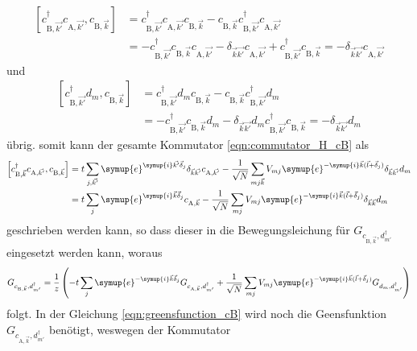 \begin{align*}
    \left [ c^\dagger_{\text{B},\vec{k'}} c_{\text{A},\vec{k'}}, c_{\text{B},\vec{k}} \right ]
        &= c^\dagger_{\text{B},\vec{k'}} c_{\text{A},\vec{k'}} c_{\text{B},\vec{k}} - c_{\text{B},\vec{k}} c^\dagger_{\text{B},\vec{k'}} c_{\text{A},\vec{k'}} \\
        &= - c^\dagger_{\text{B},\vec{k'}} c_{\text{B},\vec{k}} c_{\text{A},\vec{k'}} - \delta_{\vec{k}\vec{k'}} c_{\text{A},\vec{k'}}
        + c^\dagger_{\text{B},\vec{k'}} c_{\text{B},\vec{k}} =  - \delta_{\vec{k}\vec{k'}} c_{\text{A},\vec{k'}}
\end{align*}
und 
\begin{align}
    \left [ c^\dagger_{\text{B},\vec{k'}} d_m, c_{\text{B},\vec{k}} \right ] &=
        c^\dagger_{\text{B},\vec{k'}} d_m c_{\text{B},\vec{k}} - c_{\text{B},\vec{k}} c^\dagger_{\text{B},\vec{k'}} d_m \\
        &= - c^\dagger_{\text{B},\vec{k'}} c_{\text{B},\vec{k}} d_m - \delta_{\vec{k}\vec{k'}} d_m c^\dagger_{\text{B},\vec{k'}} c_{\text{B},\vec{k}}
        = - \delta_{\vec{k}\vec{k'}} d_m \label{eqn:commutator-x}
\end{align}
übrig.
somit kann der gesamte Kommutator \eqref{eqn:commutator_H_cB} als 
\begin{align*}
    \left [ c^\dagger_{\text{B},\vec{k}} c_{\text{A},\vec{k'}}, c_{\text{B},\vec{k}} \right ]
     &= t \sum_{j,\vec{k'}} \symup{e}^{\symup{i}\vec{k'} \vec{\delta}_j} \delta_{\vec{k}\vec{k'}} c_{\text{A},\vec{k'}}
      - \frac{1}{\sqrt{N}}\sum_{mj\vec{k}} V_{mj} \symup{e}^{-\symup{i}\vec{k} (\vec{l} + \vec{\delta}_j)} \delta_{\vec{k}\vec{k'}} d_m  \\
     &=  t \sum_{j} \symup{e}^{\symup{i}\vec{k} \vec{\delta}_j} c_{\text{A},\vec{k}}
     - \frac{1}{\sqrt{N}}\sum_{mj} V_{mj} \symup{e}^{-\symup{i}\vec{k} (\vec{l} + \vec{\delta}_j)} \delta_{\vec{k}\vec{k}} d_m
\end{align*}
geschrieben werden kann, so dass dieser in die Bewegungsleichung für $G_{c_{\text{B},\vec{k}}, d^\dagger_{m'}}$ eingesetzt werden kann, woraus
\begin{align}
    G_{c_{\text{B},\vec{k}}, d^\dagger_{m'}} =\frac{1}{z} \left (- t \sum_{j} \symup{e}^{-\symup{i}\vec{k} \vec{\delta}_j} G_{c_{\text{A},\vec{k}},d^\dagger_{m'}} + 
    \frac{1}{\sqrt{N}} \sum_{mj} V_{mj} \symup{e}^{-\symup{i}\vec{k} (\vec{l}+ \vec{\delta}_j)} G_{d_m, d_{m'}^\dagger} \right )  \label{eqn:greensfunction_cB}
\end{align}
folgt.
In der Gleichung \eqref{eqn:greensfunction_cB} wird noch die Geensfunktion $G_{c_{\text{A},\vec{k}},d^\dagger_{m'}}$ benötigt, weswegen der Kommutator
